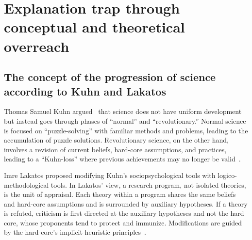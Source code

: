 %
%
%
\chapter{Explanation trap through conceptual and theoretical overreach}
\label{2023-UFO-Appendix-Explanation-Trap} %
\label{2023-UFO-part-Perception-flight-characteristics-to}








\section{The concept of the progression of science according to Kuhn and Lakatos}

Thomas Samuel Kuhn argued~\cite{kuhn} that science does not have uniform development but instead goes through phases of ``normal'' and ``revolutionary.'' Normal science is focused on ``puzzle-solving'' with familiar methods and problems, leading to the accumulation of puzzle solutions. Revolutionary science, on the other hand, involves a revision of current beliefs, hard-core assumptions, and practices, leading to a ``Kuhn-loss'' where previous achievements may no longer be valid~\cite{sep-thomas-kuhn}.

Imre Lakatos proposed modifying Kuhn's sociopsychological tools with logico-methodological tools. In Lakatos' view, a research program, not isolated theories, is the unit of appraisal. Each theory within a program shares the same beliefs and hard-core assumptions and is surrounded by auxiliary hypotheses. If a theory is refuted, criticism is first directed at the auxiliary hypotheses and not the hard core, whose proponents tend to protect and immunize. Modifications are guided by the hard-core's implicit heuristic principles~\cite{sep-lakatos}.

